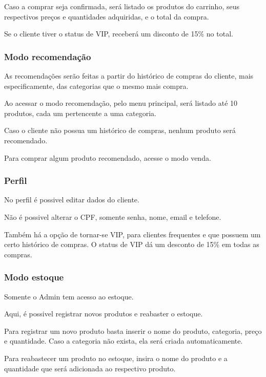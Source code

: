 Caso a comprar seja confirmada, será listado os produtos do carrinho, seus respectivos preços e quantidades adquiridas, e o total da compra.

Se o cliente tiver o status de V\+IP, receberá um disconto de 15\% no total.

\subsubsection*{Modo recomendação}

As recomendações serão feitas a partir do histórico de compras do cliente, mais especificamente, das categorias que o mesmo mais compra.

Ao acessar o modo recomendação, pelo menu principal, será listado até 10 produtos, cada um pertencente a uma categoria.

Caso o cliente não possua um histórico de compras, nenhum produto será recomendado.

Para comprar algum produto recomendado, acesse o modo venda.

\subsubsection*{Perfil}

No perfil é possivel editar dados do cliente.

Não é possivel alterar o C\+PF, somente senha, nome, email e telefone.

Também há a opção de \textquotesingle{}tornar-\/se V\+IP\textquotesingle{}, para clientes frequentes e que possuem um certo histórico de compras. O status de V\+IP dá um desconto de 15\% em todas as compras.

\subsubsection*{Modo estoque}

Somente o Admin tem acesso ao estoque.

Aqui, é possivel registrar novos produtos e reabaster o estoque.

Para registrar um novo produto basta inserir o nome do produto, categoria, preço e quantidade. Caso a categoria não exista, ela será criada automaticamente.

Para reabastecer um produto no estoque, insira o nome do produto e a quantidade que será adicionada ao respectivo produto. 